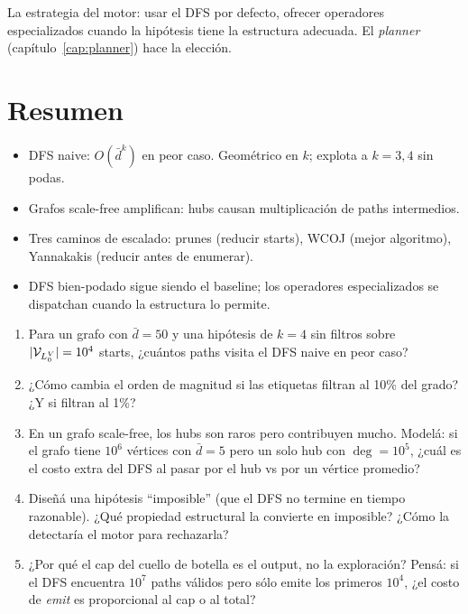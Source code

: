 \noindent
La estrategia del motor: usar el DFS por defecto, ofrecer
operadores especializados cuando la hipótesis tiene la estructura
adecuada. El \emph{planner} (capítulo~\ref{cap:planner}) hace la
elección.

\section{Resumen}

\begin{itemize}
    \item DFS naive: \(O(\bar{d}^k)\) en peor caso. Geométrico en
    \(k\); explota a \(k = 3, 4\) sin podas.
    \item Grafos scale-free amplifican: hubs causan multiplicación
    de paths intermedios.
    \item Tres caminos de escalado: prunes (reducir starts),
    WCOJ (mejor algoritmo), Yannakakis (reducir antes de enumerar).
    \item DFS bien-podado sigue siendo el baseline; los operadores
    especializados se dispatchan cuando la estructura lo permite.
\end{itemize}

\begin{ejercicios}
\begin{enumerate}
    \item \starred{} Para un grafo con \(\bar{d} = 50\) y una
    hipótesis de \(k = 4\) sin filtros sobre \(|\mathcal{V}_{L_0^V}| = 10^4\)
    starts, ¿cuántos paths visita el DFS naive en peor caso?

    \item ¿Cómo cambia el orden de magnitud si las etiquetas filtran
    al 10\% del grado? ¿Y si filtran al 1\%?

    \item \starred{} En un grafo scale-free, los hubs son raros
    pero contribuyen mucho. Modelá: si el grafo tiene \(10^6\)
    vértices con \(\bar{d} = 5\) pero un solo hub con
    \(\deg = 10^5\), ¿cuál es el costo extra del DFS al pasar por
    el hub vs por un vértice promedio?

    \item Diseñá una hipótesis ``imposible'' (que el DFS no termine
    en tiempo razonable). ¿Qué propiedad estructural la convierte
    en imposible? ¿Cómo la detectaría el motor para rechazarla?

    \item ¿Por qué el cap del cuello de botella es el output, no
    la exploración? Pensá: si el DFS encuentra \(10^7\) paths
    válidos pero sólo emite los primeros \(10^4\), ¿el costo de
    \emph{emit} es proporcional al cap o al total?
\end{enumerate}
\end{ejercicios}
